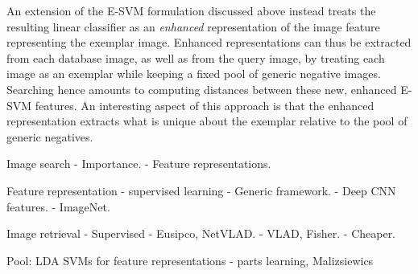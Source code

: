 An extension \cite{ZePe15} of the E-SVM formulation discussed above instead treats the resulting linear classifier as an \emph{enhanced} representation of the image feature representing the exemplar image. Enhanced representations can thus be extracted from each database image, as well as from the query image, by treating each image as an exemplar while keeping a fixed pool of generic negative images. Searching hence amounts to computing distances between these new, enhanced E-SVM features. An interesting aspect of this approach is that the enhanced representation extracts what is unique about the exemplar relative to the pool of generic negatives.



Image search
- Importance.
- Feature representations. 

Feature representation - supervised learning
- Generic framework.
- Deep CNN features.
- ImageNet.

Image retrieval
- Supervised - Eusipco, NetVLAD.
- VLAD, Fisher.
- Cheaper.

Pool:
LDA
SVMs for feature representations - parts learning, Malizsiewics





